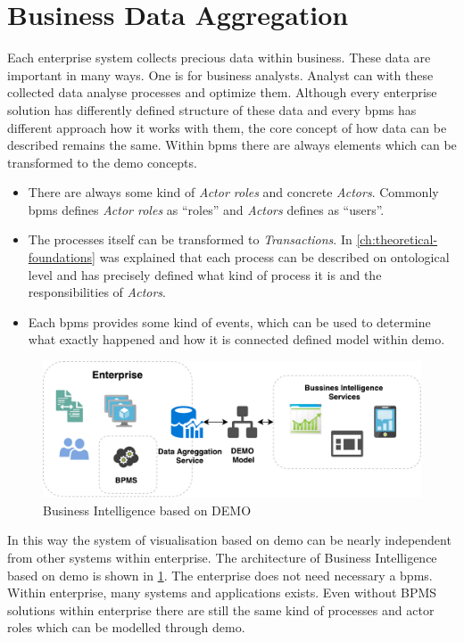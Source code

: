 \section{Business Data Aggregation}
Each enterprise system collects precious data within business. These data are important in many ways. One is for business analysts. Analyst can with these collected data analyse processes and optimize them. Although every enterprise solution has differently defined structure of these data and every \gls{bpms} has different approach how it works with them, the core concept of how data can be described remains the same. 
Within \gls{bpms} there are always elements which can be transformed to the \gls{demo} concepts.
\begin{itemize}
\item There are always some kind of \textit{Actor roles} and concrete \textit{Actors}. Commonly \gls{bpms} defines \textit{Actor roles} as ``roles'' and \textit{Actors} defines as ``users''.
\item The processes itself can be transformed to \textit{Transactions}. In \cref{ch:theoretical-foundations} was explained that each process can be described on ontological level and has precisely defined what kind of process it is and the responsibilities of \textit{Actors}.
\item Each \gls{bpms} provides some kind of events, which can be used to determine what exactly happened and how it is connected defined model within \gls{demo}.
\end{itemize}

\begin{figure}[ht!]
  \centering
  \includegraphics[width=12cm,keepaspectratio]{img/bi-demo-overview}
  \caption{Business Intelligence based on DEMO}
  \label{fig:bi-demo-overview}
\end{figure}    

In this way the system of visualisation based on \gls{demo} can be nearly independent from other systems within enterprise. The architecture of Business Intelligence based on \gls{demo} is shown in \cref{fig:bi-demo-overview}. The enterprise does not need necessary a \gls{bpms}. Within enterprise, many systems and applications exists. Even without BPMS solutions within enterprise there are still the same kind of processes and actor roles which can be modelled through \gls{demo}.


